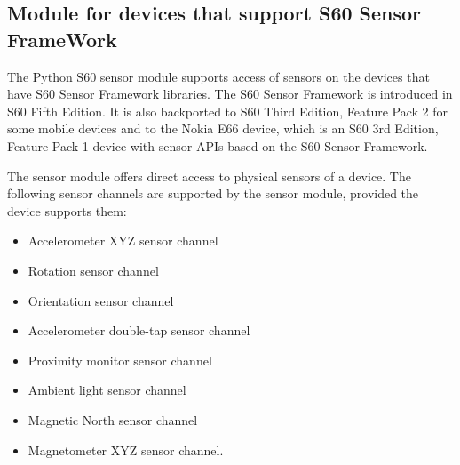 %
%
%

\subsection{Module for devices that support S60 Sensor FrameWork}
\label{subsec:sensorfw}

The Python S60 sensor module supports access of sensors on the devices that have S60 Sensor Framework libraries. The S60 Sensor Framework is introduced in S60 Fifth Edition. It is also backported to S60 Third Edition, Feature Pack 2 for some mobile devices and to the Nokia E66 device, which is an S60 3rd Edition, Feature Pack 1 device with sensor APIs based on the S60 Sensor Framework.

The sensor module offers direct access to physical sensors of a device. The following sensor channels are supported by the sensor module, provided the device supports them:

\begin{itemize}
\item Accelerometer XYZ sensor channel
\item Rotation sensor channel
\item Orientation sensor channel
\item Accelerometer double-tap sensor channel
\item Proximity monitor sensor channel
\item Ambient light sensor channel
\item Magnetic North sensor channel
\item Magnetometer XYZ sensor channel.
\end{itemize}

